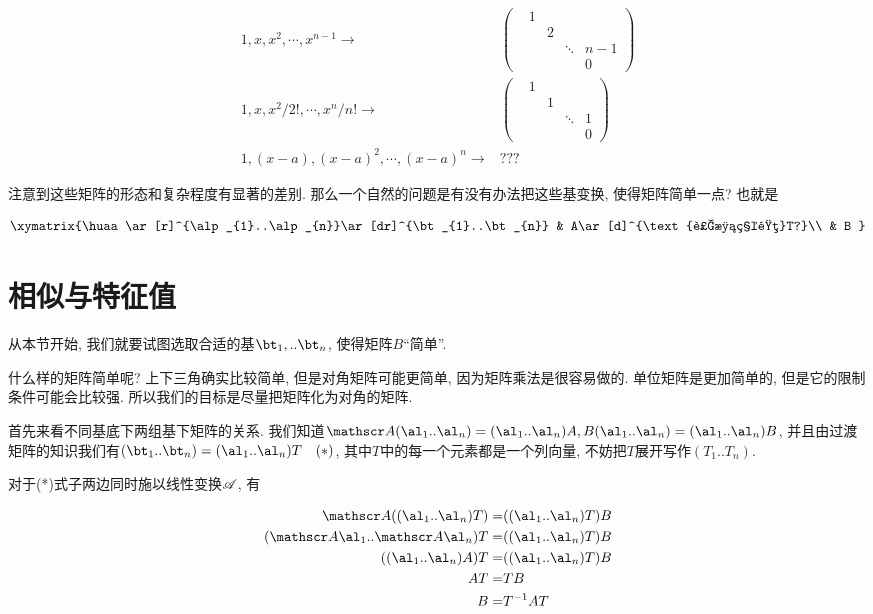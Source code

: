 \begin{align*}
1,x,x^{2},\cdots,x^{n-1}\rightarrow & \begin{pmatrix} & 1\\
 &  & 2\\
 &  &  & \ddots & n-1\\
 &  &  &  & 0
\end{pmatrix}\\
1,x,x^{2}/2!,\cdots,x^{n}/n!\rightarrow & \begin{pmatrix} & 1\\
 &  & 1\\
 &  &  & \ddots & 1\\
 &  &  &  & 0
\end{pmatrix}\\
1,(x-a),(x-a)^{2},\cdots,(x-a)^{n}\rightarrow & ???
\end{align*}

注意到这些矩阵的形态和复杂程度有显著的差别. 那么一个自然的问题是有没有办法把这些基变换, 使得矩阵简单一点? 也就是

\[
\xymatrix{\huaa\ar[r]^{\alp_{1}..\alp_{n}}\ar[dr]^{\bt_{1}..\bt_{n}} & A\ar[d]^{\text{过渡矩阵}T?}\\
 & B
}
\]


\section{相似与特征值}

从本节开始, 我们就要试图选取合适的基$\bt_{1},..\bt_{n}$, 使得矩阵$B$``简单''. 

什么样的矩阵简单呢? 上下三角确实比较简单, 但是对角矩阵可能更简单, 因为矩阵乘法是很容易做的. 单位矩阵是更加简单的, 但是它的限制条件可能会比较强.
所以我们的目标是尽量把矩阵化为对角的矩阵. 

首先来看不同基底下两组基下矩阵的关系. 我们知道$\huaa(\al_{1}..\al_{n})=(\al_{1}..\al_{n})A,B(\al_{1}..\al_{n})=(\al_{1}..\al_{n})B$,
并且由过渡矩阵的知识我们有$(\bt_{1}..\bt_{n})=(\al_{1}..\al_{n})T\quad(*)$, 其中$T$中的每一个元素都是一个列向量,
不妨把$T$展开写作$(T_{1}..T_{n})$.

对于({*})式子两边同时施以线性变换$\mathscr{A}$, 有

\begin{align*}
\huaa((\al_{1}..\al_{n})T)= & ((\al_{1}..\al_{n})T)B\\
(\huaa\al_{1}..\huaa\al_{n})T= & ((\al_{1}..\al_{n})T)B\\
((\al_{1}..\al_{n})A)T= & ((\al_{1}..\al_{n})T)B\\
AT= & TB\\
B= & T^{-1}AT
\end{align*}

